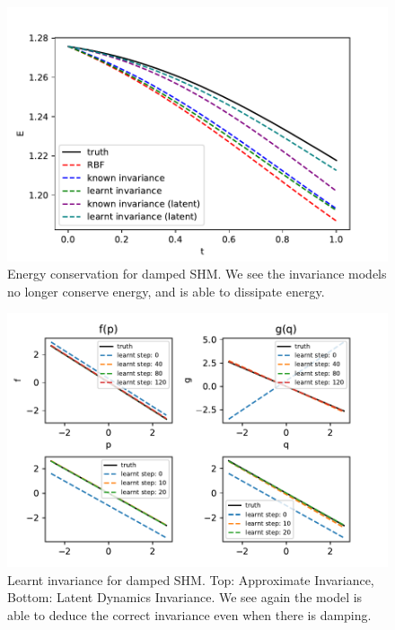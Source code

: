 \documentclass{statsmsc}
\begin{document}
\begin{figure}[H] 
  \includegraphics[width=0.8\linewidth]{../codes/figures/damped_shm_energy.pdf}
  \centering
  \caption{Energy conservation for damped SHM. We see the invariance models no longer conserve energy, and is able to dissipate energy.}
  \label{fig:damped_shm_energy}
\end{figure}


\begin{figure}[H] 
  \includegraphics[width=0.8\linewidth]{../codes/figures/damped_shm_learnt_over_time.pdf}
  \centering
  \caption{Learnt invariance for damped SHM. Top: Approximate Invariance, Bottom: Latent Dynamics Invariance. We see again the model is able to deduce the correct invariance even when there is damping.}
  \label{fig:damped_shm_learnt}
\end{figure}
\end{document}
